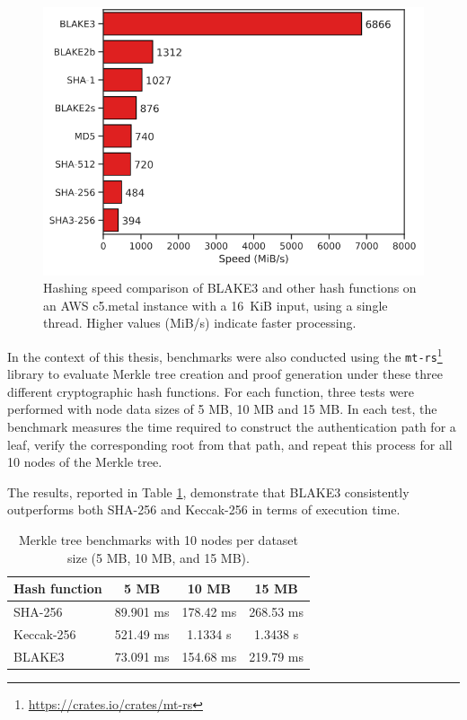 \begin{figure}
    \centering
    \includegraphics[width=0.7\linewidth]{assets/blake3-speed.png}
    \caption{Hashing speed comparison of BLAKE3 and other hash functions on an AWS c5.metal instance
with a 16~KiB input, using a single thread. Higher values (MiB/s) indicate faster processing.}
    \label{fig:blak3-speed}
\end{figure}

In the context of this thesis, benchmarks were also conducted using the \texttt{mt-rs}\footnote{\url{https://crates.io/crates/mt-rs}} library to evaluate Merkle tree creation and proof generation under these three different cryptographic hash functions.  
For each function, three tests were performed with node data sizes of 5 MB, 10 MB and 15 MB.  
In each test, the benchmark measures the time required to construct the authentication path for a leaf, verify the corresponding root from that path, and repeat this process for all 10 nodes of the Merkle tree.

The results, reported in Table \ref{tab:benchmarks-hash-functions}, demonstrate that BLAKE3 consistently outperforms both SHA-256 and Keccak-256 in terms of execution time.

\begin{table}[h!]
    \centering
    \begin{tabular}{|l|c|c|c|}
    \hline
       \textbf{Hash function} & \textbf{5 MB} & \textbf{10 MB} & \textbf{15 MB} \\
       \hline
        SHA-256 & 89.901 ms & 178.42 ms & 268.53 ms \\
        Keccak-256 & 521.49 ms & 1.1334 s & 1.3438 s \\
        BLAKE3 & 73.091 ms & 154.68 ms & 219.79 ms \\
        \hline
    \end{tabular}
    \caption{Merkle tree benchmarks with 10 nodes per dataset size (5 MB, 10 MB, and 15 MB).}
    \label{tab:benchmarks-hash-functions}
\end{table}
